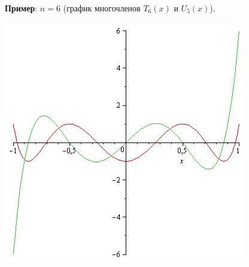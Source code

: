 \textbf{Пример}: $n=6$ (график многочленов $T_6(x)$ и $U_5(x)$).\begin{center}
    \includegraphics[scale=0.5]{T6U5.jpg} \end{center}
